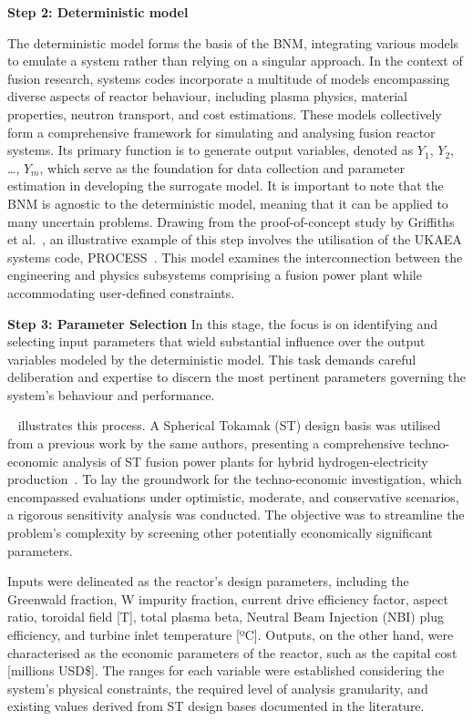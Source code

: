 \documentclass[journal]{IEEEtran}
\begin{document}
\textbf{Step 2: Deterministic model}

The deterministic model forms the basis of the BNM, integrating various models to emulate a system rather than relying on a singular approach. In the context of fusion research, systems codes incorporate a multitude of models encompassing diverse aspects of reactor behaviour, including plasma physics, material properties, neutron transport, and cost estimations. These models collectively form a comprehensive framework for simulating and analysing fusion reactor systems. Its primary function is to generate output variables, denoted as $Y_1$, $Y_2$, \ldots, $Y_m$, which serve as the foundation for data collection and parameter estimation in developing the surrogate model. It is important to note that the BNM is agnostic to the deterministic model, meaning that it can be applied to many uncertain problems. Drawing from the proof-of-concept study by Griffiths et al.~\cite{Griffiths2024}, an illustrative example of this step involves the utilisation of the UKAEA systems code, PROCESS~\cite{Kovari2014, Kovari2016}. This model examines the interconnection between the engineering and physics subsystems comprising a fusion power plant while accommodating user-defined constraints.

\textbf{Step 3: Parameter Selection} 
In this stage, the focus is on identifying and selecting input parameters that wield substantial influence over the output variables modeled by the deterministic model. This task demands careful deliberation and expertise to discern the most pertinent parameters governing the system's behaviour and performance.

~\cite{Griffiths2024} illustrates this process. A Spherical Tokamak (ST) design basis was utilised from a previous work by the same authors, presenting a comprehensive techno-economic analysis of ST fusion power plants for hybrid hydrogen-electricity production~\cite{Hidalgo-Salaverri2023}. To lay the groundwork for the techno-economic investigation, which encompassed evaluations under optimistic, moderate, and conservative scenarios, a rigorous sensitivity analysis was conducted. The objective was to streamline the problem's complexity by screening other potentially economically significant parameters.

Inputs were delineated as the reactor's design parameters, including the Greenwald fraction, W impurity fraction, current drive efficiency factor, aspect ratio, toroidal field [T], total plasma beta, Neutral Beam Injection (NBI) plug efficiency, and turbine inlet temperature [ºC]. Outputs, on the other hand, were characterised as the economic parameters of the reactor, such as the capital cost [millions USD\$]. The ranges for each variable were established considering the system's physical constraints, the required level of analysis granularity, and existing values derived from ST design bases documented in the literature.
\end{document}
